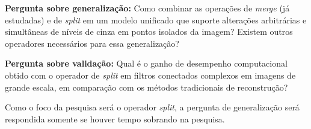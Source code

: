 \begin{tcolorbox}[colback=gray!15, colframe=gray!50, arc=2mm]
\textbf{Pergunta sobre generalização:}
Como combinar as operações de \textit{merge} (já estudadas) e de \textit{split}
em um modelo unificado que suporte alterações arbitrárias e simultâneas de
níveis de cinza em pontos isolados da imagem? Existem outros operadores
necessários para essa generalização?
\end{tcolorbox}

\begin{tcolorbox}[colback=gray!15, colframe=gray!50, arc=2mm]
\textbf{Pergunta sobre validação:}
Qual é o ganho de desempenho computacional obtido com o operador de
\textit{split} em filtros conectados complexos em imagens de grande escala,
em comparação com os métodos tradicionais de reconstrução?
\end{tcolorbox}

Como o foco da pesquisa será o operador \textit{split}, a pergunta de 
generalização será respondida somente se houver tempo sobrando na pesquisa.


